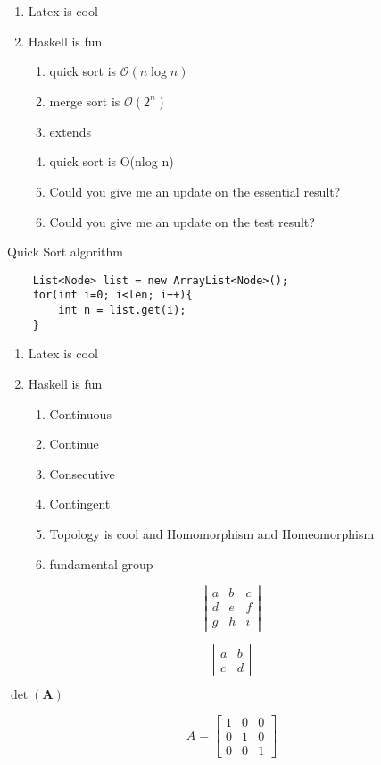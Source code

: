 \documentclass{article}
\begin{document}
\begin{enumerate}
\item Latex is cool
\item Haskell is fun
    \begin{enumerate}
    \item quick sort is $\mathcal{O}(n\log{}n)$  
    \item merge sort is $\mathcal{O}(2^n)$  
    \item extends 
    \item quick sort is O(nlog n)
    \item Could you give me an update on the essential result? 
    \item Could you give me an update on the test result?
    \end{enumerate}
\end{enumerate} 

Quick Sort algorithm 
    \begin{verbatim}
    List<Node> list = new ArrayList<Node>();
    for(int i=0; i<len; i++){
        int n = list.get(i);
    }
    \end{verbatim} 


\begin{enumerate}
\item Latex is cool
\item Haskell is fun
\begin{enumerate}
\item Continuous
\item Continue
\item Consecutive
\item Contingent
\item Topology is cool and Homomorphism and Homeomorphism  
\item fundamental group
\end{enumerate}
\end{enumerate} 

\[
\left| \begin{array}{ccc}
a & b & c \\
d & e & f \\
g & h & i \end{array} \right|
\] 


\[
\left| \begin{array}{cc}
a & b \\
c & d \end{array} \right|
\] 

$\det (\mathbf{A})$ 

\[ A= \begin{bmatrix}
1 & 0 & 0\\
0 & 1 & 0\\
0 & 0 & 1
\end{bmatrix}  \]
\end{document}
